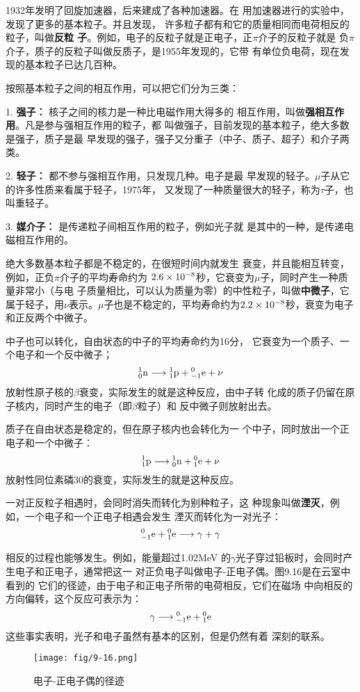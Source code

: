 1932年发明了回旋加速器，后来建成了各种加速器。在
用加速器进行的实验中，发现了更多的基本粒子。并且发现，
许多粒子都有和它的质量相同而电荷相反的粒子，叫做\textbf{反粒
子}。例如，电子的反粒子就是正电子，正$\pi$介子的反粒子就是
负$\pi$介子，质子的反粒子叫做反质子，是1955年发现的，它带
有单位负电荷，现在发现的基本粒子已达几百种。

按照基本粒子之间的相互作用，可以把它们分为三类：

1. \textbf{强子：} 核子之间的核力是一种比电磁作用大得多的
相互作用，叫做\textbf{强相互作用}。凡是参与强相互作用的粒子，都
叫做强子，目前发现的基本粒子，绝大多数是强子，质子是最
早发现的强子，强子又分重子（中子、质子、超子）和介子两类。

2. \textbf{轻子：} 都不参与强相互作用，只发现几种。电子是最
早发现的轻子。$\mu$子从它的许多性质来看属于轻子，1975年，
又发现了一种质量很大的轻子，称为$\tau$子，也叫重轻子。

3. \textbf{媒介子：} 是传递粒子间相互作用的粒子，例如光子就
是其中的一种，是传递电磁相互作用的。

绝大多数基本粒子都是不稳定的，在很短时间内就发生
衰变，并且能相互转变，例如，正负$\pi$介子的平均寿命约为
$2.6\x10^{-8}$秒，它衰变为$\mu$子，同时产生一种质量非常小（与电
子质量相比，可以认为质量为零）的中性粒子，叫做\textbf{中微子}，它
属于轻子，用$\nu$表示。$\mu$子也是不稳定的，平均寿命约为$2.2\x
10^{-8}$秒，衰变为电子和正反两个中微子。

中子也可以转化，自由状态的中子的平均寿命约为16分，
它衰变为一个质子、一个电子和一个反中微子；
\[\atom{n}{1}{0}\longrightarrow \atom{p}{1}{1}+\atom{e}{0}{-1}+\nu   \]
放射性原子核的$\beta$衰变，实际发生的就是这种反应，由中子转
化成的质子仍留在原子核内，同时产生的电子（即$\beta$粒子）和
反中微子则放射出去。

质子在自由状态是稳定的，但在原子核内也会转化为一
个中子，同时放出一个正电子和一个中微子：
\[\atom{p}{1}{1}\longrightarrow \atom{n}{1}{0}+\atom{e}{0}{1}+\nu   \]
放射性同位素磷30的衰变，实际发生的就是这种反应。

一对正反粒子相遇时，会同时消失而转化为别种粒子，这
种现象叫做\textbf{湮灭}，例如，一个电子和一个正电子相遇会发生
湮灭而转化为一对光子：
\[\atom{e}{0}{-1}+\atom{e}{0}{1}\longrightarrow \gamma+\gamma  \]

相反的过程也能够发生。例如，能量超过1.02MeV
的$\gamma$光子穿过铅板时，会同时产生电子和正电子，通常把这一
对正负电子叫做电子-正电子偶。图9.16是在云室中看到的
它们的径迹，由于电子和正电子所带的电荷相反，它们在磁场
中向相反的方向偏转，这个反应可表示为：
\[\gamma\longrightarrow \atom{e}{0}{-1}+\atom{e}{0}{1} \]
这些事实表明，光子和电子虽然有基本的区别，但是仍然有着
深刻的联系。
\begin{figure}[htp]\centering
\texttt{[image: fig/9-16.png]}
\caption{电子-正电子偶的径迹}
\end{figure}



